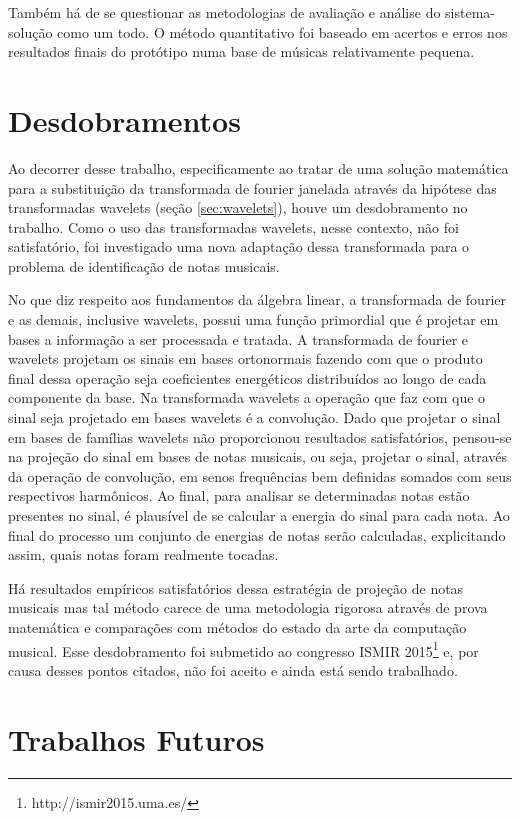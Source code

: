 Também há de se questionar as metodologias de avaliação e análise do sistema-solução como um todo. O método quantitativo foi baseado em acertos e erros nos resultados finais do protótipo numa base de músicas relativamente pequena.

\section{Desdobramentos}

Ao decorrer desse trabalho, especificamente ao tratar de uma solução matemática para a substituição da transformada de fourier janelada através da hipótese das transformadas wavelets (seção \ref{sec:wavelets}), houve um desdobramento no trabalho. Como o uso das transformadas wavelets, nesse contexto, não foi satisfatório, foi investigado uma nova adaptação dessa transformada para o problema de identificação de notas musicais.

No que diz respeito aos fundamentos da álgebra linear, a transformada de fourier e as demais, inclusive wavelets, possui uma função primordial que é projetar em bases a informação a ser processada e tratada. A transformada de fourier e wavelets projetam os sinais em bases ortonormais fazendo com que o produto final dessa operação seja coeficientes energéticos distribuídos ao longo de cada componente da base. Na transformada wavelets a operação que faz com que o sinal seja projetado em bases wavelets é a convolução. Dado que projetar o sinal em bases de famílias wavelets não proporcionou resultados satisfatórios, pensou-se na projeção do sinal em bases de notas musicais, ou seja, projetar o sinal, através da operação de convolução, em senos frequências bem definidas somados com seus respectivos harmônicos. Ao final, para analisar se determinadas notas estão presentes no sinal, é plausível de se calcular a energia do sinal para cada nota. Ao final do processo um conjunto de energias de notas serão calculadas, explicitando assim, quais notas foram realmente tocadas.

Há resultados empíricos satisfatórios dessa estratégia de projeção de notas musicais mas tal método carece de uma metodologia rigorosa através de prova matemática e comparações com métodos do estado da arte da computação musical. Esse desdobramento foi submetido ao congresso ISMIR 2015\footnote{http://ismir2015.uma.es/} e, por causa desses pontos citados, não foi aceito e ainda está sendo trabalhado.

\section{Trabalhos Futuros}

